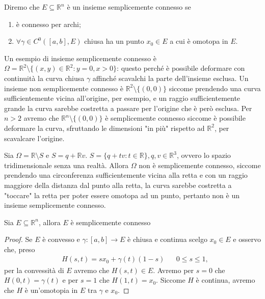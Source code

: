 \begin{definition}
	Diremo che $E \subseteq \mathbb{R}^n$ è un insieme semplicemente connesso se
	\begin{enumerate}[label=\protect\circled{\arabic*}]
		\item è connesso per archi;
		\item $\forall \gamma \in C^0([a, b], E)$ chiusa ha un punto $x_0 \in E$ a cui è omotopa in $E$.
	\end{enumerate}
\end{definition}
\begin{remark}
	Un esempio di insieme semplicemente connesso è $\Omega = \mathbb{R}^2 \setminus \{(x, y) \in \mathbb{R}^2 : y = 0, x > 0 \}$: questo perché è possibile deformare con continuità la curva chiusa $\gamma$ affinché scavalchi la parte dell'insieme esclusa. Un insieme non semplicemente connesso è $\mathbb{R}^2 \setminus \{ (0, 0) \}$ 
	siccome prendendo una curva sufficientemente vicina all'origine, per esempio, e un raggio sufficientemente grande la curva sarebbe costretta a passare per l'origine che è però esclusa.
	Per $n > 2$ avremo che $\mathbb{R}^n \setminus \{ (0, 0) \}$ è semplicemente connesso siccome è possibile deformare la curva, sfruttando le dimensioni "in più" rispetto ad $\mathbb{R}^2$, per scavalcare l'origine.
\end{remark}
\begin{remark}
	Sia $\Omega = \mathbb{R} \setminus S$ e $S = q + \mathbb{R}v$. $S=\{q+tv : t \in \mathbb{R} \}, q, v \in \mathbb{R}^3$, ovvero lo spazio tridimensionale senza una realtà. Allora $\Omega$ non è semplicemente connesso, siccome prendendo una circonferenza sufficientemente vicina alla retta e con un raggio maggiore della distanza dal punto alla retta, la curva sarebbe costretta a "toccare" la retta per poter essere omotopa ad un punto, pertanto
	non è un insieme semplicemente connesso.
\end{remark}
\begin{prop}
	Sia $E \subseteq \mathbb{R}^n$, allora $E$ è semplicemente connesso
\end{prop}
\begin{proof}
	Se $E$ è convesso e $\gamma: [a, b] \to E$ è chiusa e continua scelgo $x_0 \in E$ e osservo che, preso
	\begin{align*}
	&H(s,t) = sx_0 + \gamma(t) (1 - s) & &0 \leq s \leq 1,
	\end{align*}
	per la convessità di $E$ avremo che $H(s, t) \in E$. Avremo per $s = 0$ che $H(0, t)=\gamma(t)$ e per $s=1$ che $H(1, t)=x_0$. Siccome $H$ è continua, avremo che $H$ è un'omotopia in $E$ tra $\gamma$ e $x_0$.
\end{proof}
